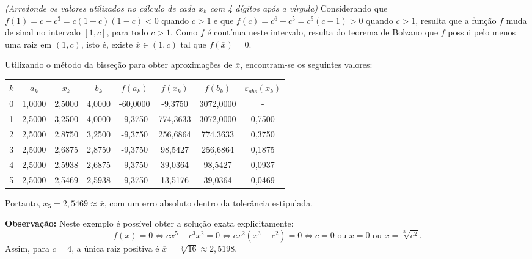 \documentclass[12pt,a4paper]{article}
\begin{document}
\begin{ExerciseList}
\textit{(Arredonde os valores utilizados no cálculo de cada $x_k$ com 4 dígitos após a vírgula)}
\Answer Considerando que $f(1) = c-c^3 = c(1+c)(1-c) < 0$ quando $c > 1$ e que $f(c) = c^6-c^5 = c^5(c-1) > 0$ quando $c > 1$, resulta que a função $f$ muda de sinal no intervalo $[1,c]$, para todo $c > 1$. Como $f$ é contínua neste intervalo, resulta do teorema de Bolzano que $f$ possui pelo menos uma raiz em $(1,c)$, isto é, existe $\overline{x} \in (1,c)$ tal que $f(\overline{x}) = 0$.

Utilizando o método da bisseção para obter aproximações de $\overline{x}$, encontram-se os seguintes valores:

\begin{center}
\begin{tabular}{cccccccc}
\hline
$k$ & $a_k$ & $x_k$ & $b_k$ & $f(a_k)$ & $f(x_k)$ & $f(b_k)$ & $\varepsilon_{abs}(x_k)$\\\hline
0 & 1,0000 & 2,5000 & 4,0000 & -60,0000 &  -9,3750 & 3072,0000 & -\\
1 & 2,5000 & 3,2500 & 4,0000 &  -9,3750 & 774,3633 & 3072,0000 & 0,7500\\
2 & 2,5000 & 2,8750 & 3,2500 &  -9,3750 & 256,6864 &  774,3633 & 0,3750\\
3 & 2,5000 & 2,6875 & 2,8750 &  -9,3750 &  98,5427 &  256,6864 & 0,1875\\
4 & 2,5000 & 2,5938 & 2,6875 &  -9,3750 &  39,0364 &   98,5427 & 0,0937\\
5 & 2,5000 & 2,5469 & 2,5938 &  -9,3750 &  13,5176 &   39,0364 & 0,0469\\\hline
\end{tabular}
\end{center}
Portanto, $x_5 = 2,5469 \approx \overline{x}$, com um erro absoluto dentro da tolerância estipulada.

\textbf{Observação:} Neste exemplo é possível obter a solução exata explicitamente:
\[
f(x) = 0
\Leftrightarrow
cx^5-c^3x^2 = 0
\Leftrightarrow
cx^2(x^3-c^2) = 0
\Leftrightarrow
c = 0 \text{ ou }
x = 0 \text{ ou }
x = \sqrt[3]{c^2}.
\]
Assim, para $c = 4$, a única raiz positiva é $\overline{x} = \sqrt[3]{16} \approx 2,5198$.


\end{ExerciseList}
\end{document}
